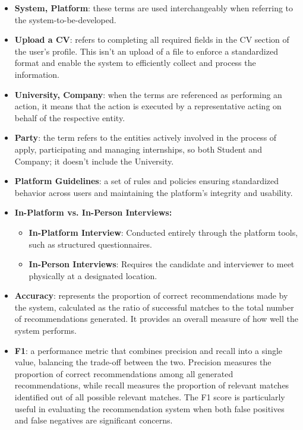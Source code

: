 \begin{itemize}

\item \textbf{System, Platform}: these terms are used interchangeably when referring to the system-to-be-developed.

\item \textbf{Upload a CV}: refers to completing all required fields in the CV section of the user's profile. This isn't an upload of a file to enforce a standardized format and enable the system to efficiently collect and process the information.

\item \textbf{University, Company}: when the terms are referenced as performing an action, it means that the action is executed by a representative acting on behalf of the respective entity.

\item \textbf{Party}: the term refers to the entities actively involved in the process of apply, participating and managing internships, so both Student and Company; it doesn't include the University.

\item \textbf{Platform Guidelines}: a set of rules and policies ensuring standardized behavior across users and maintaining the platform's integrity and usability.

\item \textbf{In-Platform vs. In-Person Interviews:}

\begin{itemize}
\item \textbf{In-Platform Interview}: Conducted entirely through the platform tools, such as structured questionnaires.
\item \textbf{In-Person Interviews}: Requires the candidate and interviewer to meet physically at a designated location.
\end{itemize}

\item \textbf{Accuracy}: represents the proportion of correct recommendations made by the system, calculated as the ratio of successful matches to the total number of recommendations generated. It provides an overall measure of how well the system performs.

\item \textbf{F1}: a performance metric that combines precision and recall into a single value, balancing the trade-off between the two. Precision measures the proportion of correct recommendations among all generated recommendations, while recall measures the proportion of relevant matches identified out of all possible relevant matches. The F1 score is particularly useful in evaluating the recommendation system when both false positives and false negatives are significant concerns.

\end{itemize}

